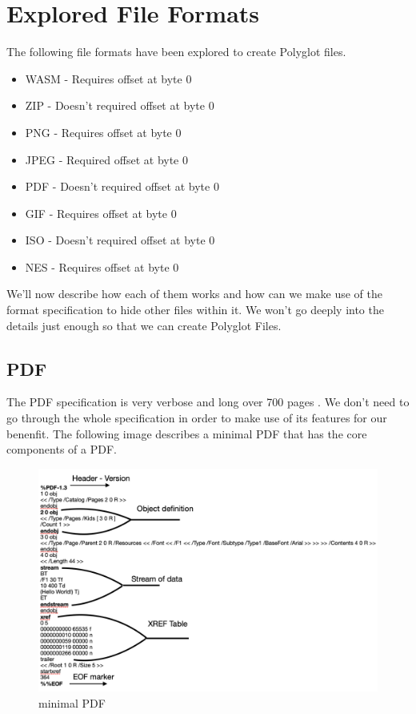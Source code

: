 \section{Explored File Formats}

The following file formats have been explored to create Polyglot files.

\begin{itemize}
  \item WASM - Requires offset at byte 0
  \item ZIP -  Doesn't required offset at byte 0
  \item PNG - Requires offset at byte 0
  \item JPEG - Required offset at byte 0
  \item PDF - Doesn't required offset at byte 0
  \item GIF - Requires offset at byte 0
  \item ISO - Doesn't required offset at byte 0
  \item NES - Requires offset at byte 0
\end{itemize}

We'll now describe how each of them works and how can we make use of the format specification to hide other
files within it. We won't go deeply into the details just enough so that we can create Polyglot Files.

\subsection{PDF}
The PDF specification is very verbose and long over 700 pages \cite{PDF}. We don't need to
go through the whole specification in order to make use of its features for our benenfit. The following image  
describes a minimal PDF that has the core components of a PDF.

\begin{figure}[h]
    \center
    \includegraphics[width=17cm]{images/pdf.png}
    \caption{minimal PDF}
\end{figure}

